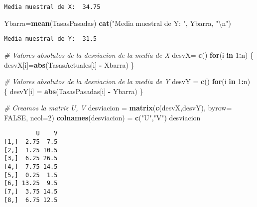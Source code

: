 \documentclass[
  a4paper,
  oneside,
  openany]{book}
\newenvironment{Shaded}{\begin{snugshade}}{\end{snugshade}}
\newcommand{\CharTok}[1]{\textcolor[rgb]{0.31,0.60,0.02}{#1}}
\newcommand{\CommentTok}[1]{\textcolor[rgb]{0.56,0.35,0.01}{\textit{#1}}}
\newcommand{\ControlFlowTok}[1]{\textcolor[rgb]{0.13,0.29,0.53}{\textbf{#1}}}
\newcommand{\DataTypeTok}[1]{\textcolor[rgb]{0.13,0.29,0.53}{#1}}
\newcommand{\DecValTok}[1]{\textcolor[rgb]{0.00,0.00,0.81}{#1}}
\newcommand{\KeywordTok}[1]{\textcolor[rgb]{0.13,0.29,0.53}{\textbf{#1}}}
\newcommand{\NormalTok}[1]{#1}
\newcommand{\OperatorTok}[1]{\textcolor[rgb]{0.81,0.36,0.00}{\textbf{#1}}}
\newcommand{\OtherTok}[1]{\textcolor[rgb]{0.56,0.35,0.01}{#1}}
\newcommand{\StringTok}[1]{\textcolor[rgb]{0.31,0.60,0.02}{#1}}
\begin{document}
\begin{verbatim}
Media muestral de X:  34.75 
\end{verbatim}

\begin{Shaded}
\begin{Highlighting}[]
\NormalTok{Ybarra=}\KeywordTok{mean}\NormalTok{(TasasPasadas)}
\KeywordTok{cat}\NormalTok{(}\StringTok{"Media muestral de Y: "}\NormalTok{, Ybarra, }\StringTok{"}\CharTok{\textbackslash{}n}\StringTok{"}\NormalTok{)}
\end{Highlighting}
\end{Shaded}

\begin{verbatim}
Media muestral de Y:  31.5 
\end{verbatim}

\begin{Shaded}
\begin{Highlighting}[]
\CommentTok{\# Valores absolutos de la desviacion de la media de X}
\NormalTok{desvX=}\StringTok{ }\KeywordTok{c}\NormalTok{()}
\ControlFlowTok{for}\NormalTok{(i }\ControlFlowTok{in} \DecValTok{1}\OperatorTok{:}\NormalTok{n) \{}
\NormalTok{  desvX[i]=}\KeywordTok{abs}\NormalTok{(TasasActuales[i] }\OperatorTok{{-}}\StringTok{ }\NormalTok{Xbarra)}
\NormalTok{\}}

\CommentTok{\# Valores absolutos de la desviacion de la media de Y}
\NormalTok{desvY =}\StringTok{ }\KeywordTok{c}\NormalTok{()}
\ControlFlowTok{for}\NormalTok{(i }\ControlFlowTok{in} \DecValTok{1}\OperatorTok{:}\NormalTok{n) \{}
\NormalTok{  desvY[i] =}\StringTok{ }\KeywordTok{abs}\NormalTok{(TasasPasadas[i] }\OperatorTok{{-}}\StringTok{ }\NormalTok{Ybarra)}
\NormalTok{\}}

\CommentTok{\# Creamos la matriz U, V}
\NormalTok{desviacion =}\StringTok{ }\KeywordTok{matrix}\NormalTok{(}\KeywordTok{c}\NormalTok{(desvX,desvY), }\DataTypeTok{byrow=} \OtherTok{FALSE}\NormalTok{, }\DataTypeTok{ncol=}\DecValTok{2}\NormalTok{)}
\KeywordTok{colnames}\NormalTok{(desviacion) =}\StringTok{ }\KeywordTok{c}\NormalTok{(}\StringTok{"U"}\NormalTok{,}\StringTok{"V"}\NormalTok{)}
\NormalTok{desviacion}
\end{Highlighting}
\end{Shaded}

\begin{verbatim}
         U    V
[1,]  2.75  7.5
[2,]  1.25 10.5
[3,]  6.25 26.5
[4,]  7.75 14.5
[5,]  0.25  1.5
[6,] 13.25  9.5
[7,]  3.75 14.5
[8,]  6.75 12.5
\end{verbatim}
\end{document}
